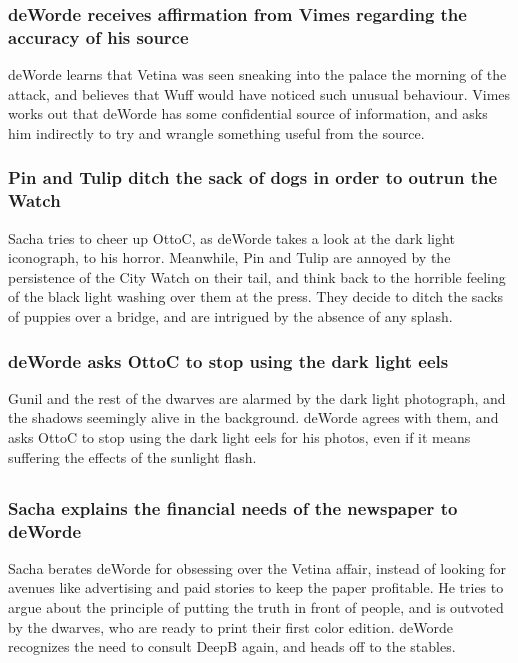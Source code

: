 \subsubsection{\Gls{deWorde} receives affirmation from \Gls{Vimes} regarding the accuracy of his
    source}
\Gls{deWorde} learns that \Gls{Vetina} was seen sneaking into the palace the morning of the attack,
and believes that \Gls{Wuff} would have noticed such unusual behaviour. \Gls{Vimes} works out that
\Gls{deWorde} has some confidential source of information, and asks him indirectly to try and
wrangle something useful from the source.

\subsubsection{\Gls{Pin} and \Gls{Tulip} ditch the sack of dogs in order to outrun the Watch}
\Gls{Sacha} tries to cheer up \Gls{OttoC}, as \Gls{deWorde} takes a look at the dark light
iconograph, to his horror. Meanwhile, \Gls{Pin} and \Gls{Tulip} are annoyed by the persistence of
the City Watch on their tail, and think back to the horrible feeling of the black light washing
over them at the press. They decide to ditch the sacks of puppies over a bridge, and are intrigued
by the absence of any splash.

\subsubsection{\Gls{deWorde} asks \Gls{OttoC} to stop using the dark light eels}
\Gls{Gunil} and the rest of the dwarves are alarmed by the dark light photograph, and the shadows
seemingly alive in the background. \Gls{deWorde} agrees with them, and asks \Gls{OttoC} to stop
using the dark light eels for his photos, even if it means suffering the effects of the sunlight
flash.

\subsection{}
\subsubsection{\Gls{Sacha} explains the financial needs of the newspaper to \Gls{deWorde}}
\Gls{Sacha} berates \Gls{deWorde} for obsessing over the \Gls{Vetina} affair, instead of looking for
avenues like advertising and paid stories to keep the paper profitable. He tries to argue about the
principle of putting the truth in front of people, and is outvoted by the dwarves, who are ready to
print their first color edition. \Gls{deWorde} recognizes the need to consult \Gls{DeepB} again,
and heads off to the stables.

